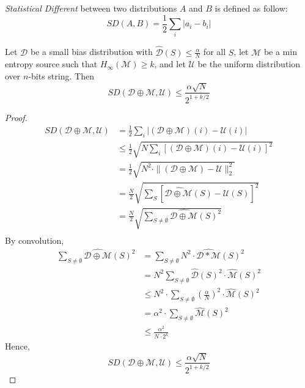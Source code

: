 \begin{definition}
\textit{Statistical Different} between two distributions $A$ and $B$ is defined as follow:
$$SD(A,B) = \frac{1}{2} \sum\limits_{i} |a_i - b_i |$$
\end{definition}
\begin{theorem}
Let $\mathcal{D}$ be a small bias distribution with $\widehat{\mathcal{D}}(S) \leq \frac{\alpha}{N}$ for all $S$, let $\mathcal{M}$ be a min entropy source such that $H_\infty(\mathcal{M}) \geq k$, and let $\mathcal{U}$ be  the uniform distribution over $n$-bits string. Then $$SD(\mathcal{D} \oplus \mathcal{M}, \mathcal{U}) \leq \frac{\alpha \sqrt{N}}{2^{1+k/2}}$$
\end{theorem}

\begin{proof} 
\begin{align*}
SD(\mathcal{D} \oplus \mathcal{M}, \mathcal{U})
&= \frac{1}{2} \sum\limits_i |(\mathcal{D} \oplus \mathcal{M})(i) - \mathcal{U}(i) | \\
& \leq \frac{1}{2}  \sqrt{N \sum\limits_i [(\mathcal{D} \oplus \mathcal{M})(i) - \mathcal{U}(i)]^2} \\
&= \frac{1}{2}  \sqrt{N^2 \cdot \| (\mathcal{D} \oplus \mathcal{M}) - \mathcal{U} \|_2^2} \\
& = \frac{N}{2} \sqrt{\sum\limits_{S} 
	[\widehat{\mathcal{D} \oplus \mathcal{M}}(S) - \mathcal{U}(S)]^2} \\
& = \frac{N}{2} \sqrt{\sum\limits_{S \neq \emptyset} 
	\widehat{\mathcal{D} \oplus \mathcal{M}}(S)^2} \\
\end{align*}
By convolution,
\begin{align*}
\sum\limits_{S \neq \emptyset} \widehat{\mathcal{D} \oplus \mathcal{M}}(S)^2 
&= \sum\limits_{S \neq \emptyset} N^2 \cdot \widehat{\mathcal{D} * \mathcal{M}} (S)^2 \\
&= N^2 \sum\limits_{S \neq \emptyset} \widehat{\mathcal{D}}(S)^2 \cdot \widehat{\mathcal{M}}(S)^2 \\
& \leq N^2 \cdot  \sum\limits_{S \neq \emptyset} (\frac{\alpha}{N})^2 \cdot \widehat{\mathcal{M}}(S)^2 \\
&= \alpha^2 \cdot \sum\limits_{S \neq \emptyset} \widehat{\mathcal{M}}(S)^2 \\
& \leq \frac{\alpha^2}{N \cdot 2^k}
\end{align*}
Hence, 
$$SD(\mathcal{D} \oplus \mathcal{M}, \mathcal{U}) 
\leq \frac{\alpha \sqrt{N}}{2^{1+k/2}}$$
\end{proof}

